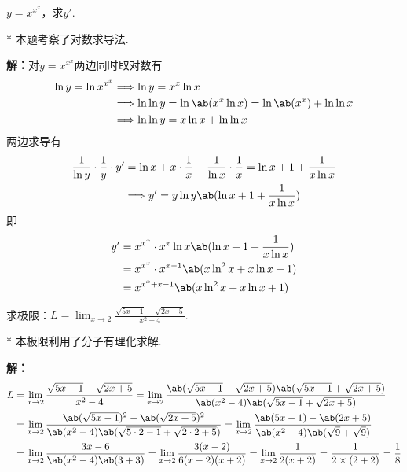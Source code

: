 \begin{problem}
    $y=x^{x^x}$，求$y'$.
\end{problem}
\begin{draft}
    \vspace{5em}
\end{draft}
\begin{solution}*
    本题考察了对数求导法.

    \textbf{解：}对$y=x^{x^x}$两边同时取对数有
    \[\begin{aligned}
        \ln y=\ln x^{x^x}&\Longrightarrow \ln y=x^x\ln x\\
        &\Longrightarrow \ln\ln y=\ln\ab(x^x\ln x )=\ln\ab(x^x )+\ln\ln x\\
        &\Longrightarrow \ln\ln y=x\ln x+\ln\ln x
    \end{aligned}\]
    两边求导有
    \[\begin{aligned}
        \frac{1}{\ln y}\cdot \frac{1}{y}\cdot y'&=\ln x+x\cdot \frac{1}{x}+\frac{1}{\ln x}\cdot \frac{1}{x}=\ln x+1+\frac{1}{x\ln x}\\
        &\Longrightarrow y'=y\ln y\ab(\ln x+1+\frac{1}{x\ln x} )
    \end{aligned}\]
    即
    \[\begin{aligned}
        y'&=x^{x^x}\cdot x^x\ln x\ab(\ln x+1+\frac{1}{x\ln x})\\
        &=x^{x^x}\cdot x^{x-1}\ab(x\ln ^2x+x\ln x+1)\\
        &=x^{x^x+x-1}\ab(x\ln ^2x+x\ln x+1)
    \end{aligned}
    \]
\end{solution}

\begin{problem}
    求极限：$L=\lim_{x\to 2} \frac{\sqrt{5x-1}-\sqrt{2x+5}}{x^2-4}$.
\end{problem}
\begin{draft}
    \vspace{5em}
\end{draft}
\begin{solution}*
    本极限利用了分子有理化求解.

    \textbf{解：}
        \[\begin{aligned}
            L&=\lim_{x\to 2} \frac{\sqrt{5x-1}-\sqrt{2x+5}}{x^2-4}=\lim_{x\to 2} \frac{\ab(\sqrt{5x-1}-\sqrt{2x+5})\ab(\sqrt{5x-1}+\sqrt{2x+5})}{\ab(x^2-4)\ab(\sqrt{5x-1}+\sqrt{2x+5})}\\
            &=\lim_{x\to 2} \frac{\ab(\sqrt{5x-1} )^2-\ab(\sqrt{2x+5} )^2}{\ab(x^2-4)\ab(\sqrt{5\cdot 2-1}+\sqrt{2\cdot 2+5})}
            =\lim_{x\to 2} \frac{\ab(5x-1 )-\ab(2x+5)}{\ab(x^2-4)\ab(\sqrt{9}+\sqrt{9})}\\
            &=\lim_{x\to 2} \frac{3x-6}{\ab(x^2-4)\ab(3+3)}
            =\lim_{x\to 2} \frac{3(x-2)}{6(x-2) (x+2)}=\lim_{x\to 2} \frac{1}{2(x+2)}=\frac{1}{2\times(2+2)}=\frac{1}{8}
        \end{aligned}\]
\end{solution}

